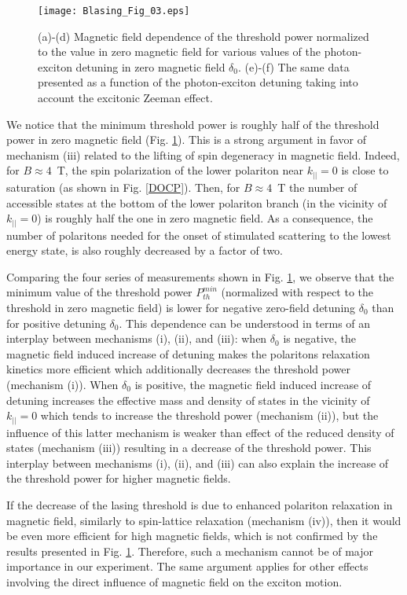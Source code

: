 \documentclass[amssymb,prb,twocolumn,floats,amsmath]{revtex4}
\begin{document}
\begin{figure}
    \texttt{[image: Blasing\_Fig\_03.eps]}
  \caption{(a)-(d) Magnetic field dependence of the threshold power normalized to the value in zero magnetic field for various values of the photon-exciton detuning in zero magnetic field $\delta_0$. (e)-(f) The same data presented as a function of the photon-exciton detuning taking into account the excitonic Zeeman effect.}
  \label{Pth_vs_B}
\end{figure}


We notice that the minimum threshold power is roughly half of the threshold power in zero magnetic field (Fig. \ref{Pth_vs_B}). This is a strong argument in favor of mechanism (iii) related to the lifting of spin degeneracy in magnetic field. Indeed, for $B \approx 4$~T, the spin polarization of the lower polariton near $k_{||}=0$ is close to saturation (as shown in Fig. \ref{DOCP}). Then, for $B \approx 4$~T the number of accessible states at the bottom of the lower polariton branch (in the vicinity of $k_{||}=0$) is roughly half the one in zero magnetic field. As a consequence, the number of polaritons needed for the onset of stimulated scattering to the lowest energy state, is also roughly decreased by a factor of two.

Comparing the four series of measurements shown in Fig. \ref{Pth_vs_B}, we observe that the minimum value of the threshold power $P_{th}^{min}$ (normalized with respect to the threshold in zero magnetic field) is lower for negative zero-field detuning $\delta_0$ than for positive detuning $\delta_0$.  This dependence can be understood in terms of an interplay between mechanisms (i), (ii), and (iii): when $\delta_0$ is negative, the magnetic field induced increase of detuning makes the polaritons relaxation kinetics more efficient which additionally decreases the threshold power (mechanism (i)). When $\delta_0$ is positive, the magnetic field induced increase of detuning increases the effective mass and density of states in the vicinity of $k_{||}=0$ which tends to increase the threshold power (mechanism (ii)), but the influence of this latter mechanism is weaker than effect of the reduced density of states (mechanism (iii)) resulting in a decrease of the threshold power. This interplay between mechanisms (i), (ii), and (iii) can also explain the increase of the threshold power for higher magnetic fields.

If the decrease of the lasing threshold is due to enhanced polariton relaxation in magnetic field, similarly to spin-lattice relaxation (mechanism (iv)), then it would be even more efficient for high magnetic fields,\cite{Goryca_PRB2015} which is not confirmed by the results presented in Fig. \ref{Pth_vs_B}. Therefore, such a mechanism cannot be of major importance in our experiment. The same argument applies for other effects involving the direct influence of magnetic field on the exciton motion.\cite{Kochereshko_SciRep2016}
\end{document}
